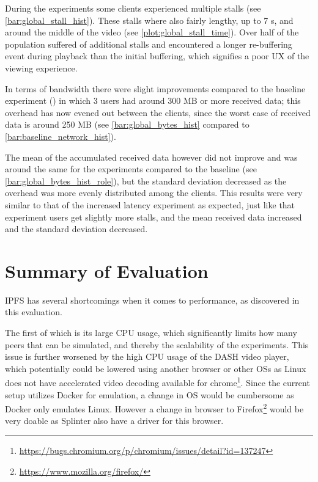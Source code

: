 During the experiments some clients experienced multiple stalls (see \autoref{bar:global_stall_hist}). These stalls where also fairly lengthy, up to 7 \ac{s}, and around the middle of the video (see \autoref{plot:global_stall_time}). Over half of the population suffered of additional stalls and encountered a longer re-buffering event during playback than the initial buffering, which signifies a poor \ac{UX} of the viewing experience.

\if{}


\fi

In terms of bandwidth there were slight improvements compared to the baseline experiment () in which 3 users had around 300 \ac{MB} or more received data; this overhead has now evened out between the clients, since the worst case of received data is around 250 \ac{MB} (see \autoref{bar:global_bytes_hist} compared to \autoref{bar:baseline_network_hist}).

The mean of the accumulated received data however did not improve and was around the same for the experiments compared to the baseline (see \autoref{bar:global_bytes_hist_role}), but the standard deviation decreased as the overhead was more evenly distributed among the clients.
This results were very similar to that of the increased latency experiment as expected, just like that experiment users get slightly more stalls, and the mean received data increased and the standard deviation decreased.

\if{}


\fi


\FloatBarrier 
\section{Summary of Evaluation}
\ac{IPFS} has several shortcomings when it comes to performance, as discovered in this evaluation.

The first of which is its large \ac{CPU} usage, which significantly limits how many peers that can be simulated, and thereby the scalability of the experiments.
This issue is further worsened by the high \ac{CPU} usage of the \ac{DASH} video player, which potentially could be lowered using another browser or other \acp{OS} as Linux does not have accelerated video decoding available for chrome\footnote{\url{https://bugs.chromium.org/p/chromium/issues/detail?id=137247}}. Since the current setup utilizes Docker for emulation, a change in \ac{OS} would be cumbersome as Docker only emulates Linux. However a change in browser to Firefox\footnote{\url{https://www.mozilla.org/firefox/}} would be very doable as Splinter also have a driver for this browser.

